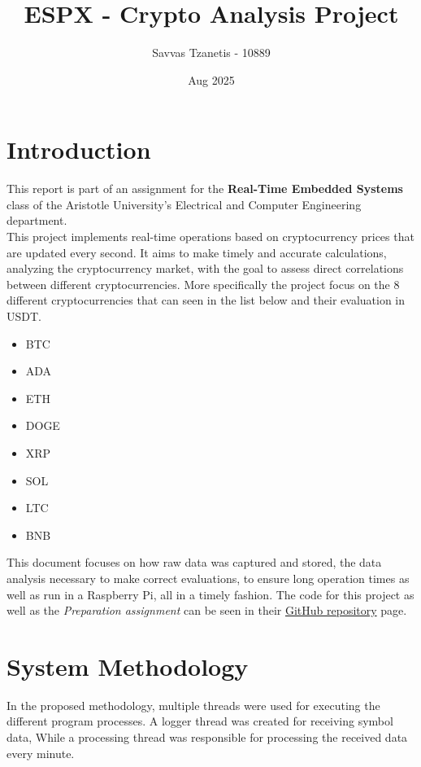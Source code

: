 \documentclass[12pt]{article}
\title{\textbf{ESPX - Crypto Analysis Project}}
\author{Savvas Tzanetis - 10889}
\date{Aug 2025}
\begin{document}
\maketitle

\section{Introduction}
    This report is part of an assignment for the \textbf{Real-Time Embedded Systems} class of the Aristotle University's 
    Electrical and Computer Engineering department.  \\

    This project implements real-time operations based on cryptocurrency prices that are updated every second. 
    It aims to make timely and accurate calculations, analyzing the cryptocurrency market, with the goal to assess 
    direct correlations between different cryptocurrencies. More specifically the project focus on the 8 different 
    cryptocurrencies that can seen in the list below and their evaluation in USDT.

    \begin{multicols}{4}
        \begin{itemize}
            \item BTC
            \item ADA
            \item ETH
            \item DOGE
            \item XRP
            \item SOL
            \item LTC
            \item BNB
        \end{itemize}
    \end{multicols}

    This document focuses on how raw data was captured and stored, the data analysis necessary to make correct evaluations, 
    to ensure long operation times as well as run in a Raspberry Pi, all in a timely fashion. The code for this project as 
    well as the \textit{Preparation assignment} can be seen in their 
    \textcolor{blue}{\href{https://github.com/stzanetis/ESPX-CryptoAnalysis}{GitHub repository}} page.

\section{System Methodology}
    In the proposed methodology, multiple threads were used for executing the different program processes. 
    A logger thread was created for receiving symbol data, While a processing thread was responsible for processing the received data every minute.
\end{document}
